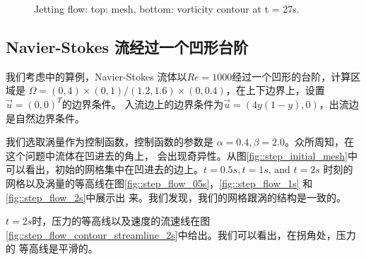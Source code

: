 \begin{figure}[!htbp]
\begin{center}
        \end{center}
        \caption{\small Jetting flow: top: mesh, bottom: vorticity contour at t = 27s.}
        \label{fig::jetting_flow_mesht27s}
       \end{figure}


   \subsection{Navier-Stokes 流经过一个凹形台阶}


      我们考虑\cite{zheng2010posteriori}中的算例，Navier-Stokes 流体以$Re = 1000$经过一个凹形的台阶，计算区域是
      $\Omega = (0, 4) \times (0, 1)/(1.2, 1.6) \times (0, 0.4)$，在上下边界上，设置$\vec{u} = (0, 0)^T$的边界条件。
      入流边上的边界条件为$\vec{u} = (4 y (1 - y), 0)$，出流边是自然边界条件。

      我们选取涡量作为控制函数，控制函数的参数是 $\alpha = 0.4, \beta = 2.0$。众所周知，在这个问题中流体在凹进去的角上，
      会出现奇异性。从图\ref{fig::step_initial_mesh}中可以看出，初始的网格集中在凹进去的边上。$t = 0.5s, t = 1s \text{, and } t = 2s$
      时刻的网格以及涡量的等高线在图\ref{fig::step_flow_05s}，\ref{fig::step_flow_1s} 和 \ref{fig::step_flow_2s}中展示出
      来。我们发现，我们的网格跟涡的结构是一致的。

      $t = 2s$时，压力的等高线以及速度的流速线在图\ref{fig::step_flow_contour_streamline_2s}中给出。我们可以看出，在拐角处，压力的
      等高线是平滑的。


